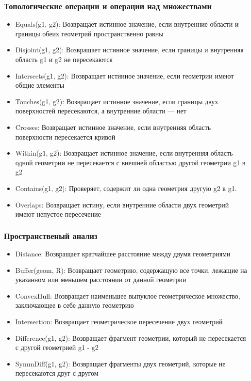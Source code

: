 \begin{frame}[allowframebreaks]
    \frametitle{Топологические операции и операции над множествами}
    \begin{itemize}
        \item Equals(g1, g2): Возвращает истинное значение, если внутренние области и
        границы обеих геометрий пространственно равны
        \item Disjoint(g1, g2): Возвращает истинное значение, если границы и внутренняя область g1 и g2 не пересекаются
        \item Intersects(g1, g2): Возвращает истинное значение, если геометрии имеют общие элементы
        \item Touches(g1, g2): Возвращает истинное значение, если границы двух поверхностей пересекаются, а внутренние области --- нет
        \item Crosses: Возвращает истинное значение, если внутренняя область поверхности пересекается кривой
        \item Within(g1, g2): Возвращает истинное значение, если внутренняя область одной геометрии не пересекается с внешней областью другой геометрии g1 в g2
        \item Contains(g1, g2): Проверяет, содержит ли одна геометрия другую g2 в g1.
        \item Overlaps: Возвращает истину, если внутренние области двух геометрий имеют непустое пересечение
    \end{itemize}
\end{frame}

\begin{frame}[allowframebreaks]
    \frametitle{Пространственый анализ}
    \begin{itemize}
        \item Distance: Возвращает кратчайшее расстояние между двумя геометриями
        \item Buffer(geom, R): Возвращает геометрию, содержащую все точки, лежащие на указанном или меньшем расстоянии от данной геометрии
        \item ConvexHull: Возвращает наименьшее выпуклое геометрическое множество, заключающее в себе данную геометрию
        \item Intersection: Возвращает геометрическое пересечение двух геометрий
        \item Difference(g1, g2): Возвращает фрагмент геометрии, который не пересекается с другой геометрией g1 - g2
        \item SymmDiff(g1, g2): Возвращает фрагменты двух геометрий, которые не пересекаются друг с другом
    \end{itemize}
\end{frame}









